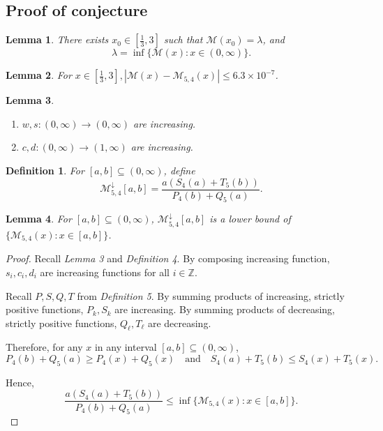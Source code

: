 \documentclass{article}
\newtheorem{definition}{Definition}
\newtheorem{lemma}{Lemma}
\newcommand*{\Z}{\mathbb{Z}}
\newcommand*{\M}{\mathcal{M}}
\begin{document}
\subsection{\centering Proof of conjecture}

\begin{lemma}
    There exists $x_0\in[\frac{1}{3},3]$ such that $\M(x_0)=\lambda$, and
    $$\lambda=\inf\{\M(x):x\in(0,\infty)\}.$$
\end{lemma}

\begin{lemma}
    For $x\in[\frac{1}{3}, 3], |\M(x)-\M_{5,4}(x)| \leq 6.3\times 10^{-7}$.
\end{lemma}

\begin{lemma}\indent
    \begin{enumerate}[label=(\arabic*)]
        \item $w, s:(0,\infty)\to(0,\infty)$ are increasing.
        \item $c, d:(0,\infty)\to(1,\infty)$ are increasing.
    \end{enumerate}
\end{lemma}

\begin{definition}
    For $[a, b]\subseteq (0,\infty)$, define 
    $$\M^\downarrow_{5,4}[a,b]=\frac{a(S_4(a)+T_5(b))}{P_4(b)+Q_5(a)}.$$
\end{definition}

\begin{lemma}
    For $[a,b]\subseteq(0,\infty)$, $\M^\downarrow_{5,4}[a,b]$ is a lower bound of $\{\M_{5,4}(x):
    x\in[a,b]\}$.
\end{lemma}
\begin{proof}
    Recall \emph{Lemma 3} and \emph{Definition 4}. By composing increasing function,
    $s_i, c_i, d_i$ are increasing functions for all $i\in\Z$. 
    
    Recall $P,S,Q,T$ from \emph{Definition 5}. By summing products of increasing, strictly positive
    functions, $P_k, S_k$ are increasing. By summing products of decreasing,
    strictly positive functions, $Q_\ell,T_\ell$ are decreasing.

    Therefore, for any $x$ in any interval $[a,b]\subseteq(0,\infty)$, 
    $$P_4(b) + Q_5(a) \geq P_4(x) + Q_5(x) \quad \text{and} \quad S_4(a)+T_5(b) \leq
    S_4(x)+T_5(x).$$
    
    Hence, $$\frac{a(S_4(a)+T_5(b))}{P_4(b)+Q_5(a)} \leq \inf\{\M_{5,4}(x):x\in[a,b]\}.$$
\end{proof}
\end{document}
